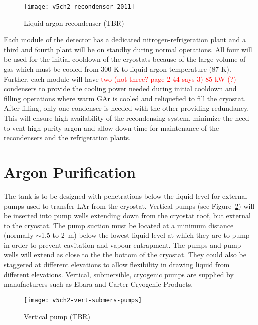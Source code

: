 \begin{figure}[htbp]
\centering
\texttt{[image: v5ch2-recondensor-2011]}
\caption{Liquid argon recondenser (TBR)}
\label{fig:v5ch2-recondenser-sept-2011}
\end{figure}

Each module of the detector has a dedicated nitrogen-refrigeration plant 
 and a third and fourth plant will be on standby during normal operations. All four will be used
for the initial cooldown of the cryostats
because of the large volume of gas which must be cooled from 300 K to liquid
argon temperature (87 K). Further, each module will
have \textcolor{red}{two (not three? page 2-44 says 3) 85 kW (?)} condensers to provide the
cooling power needed during initial cooldown and filling operations where warm GAr
is cooled and reliquefied to fill the cryostat.
After filling, only one condenser is needed with the
other providing redundancy.
This will ensure high availability of the recondensing system, minimize the need to vent high-purity argon and allow down-time for maintenance of
the recondensers and the refrigeration plants. 

\section{Argon Purification}
\label{subsec:argon-pur}
 The tank is to be designed with penetrations below the liquid level for external pumps used to transfer LAr from the cryostat. Vertical 
pumps (see Figure~\ref{fig:vert-submers-pumps}) will be inserted into 
pump wells extending down from the cryostat roof, but external to the cryostat.  The pump suction 
must be located at a minimum distance (normally $\sim$1.5 to 2~m) below 
the lowest liquid level at which they are to pump in order to prevent 
cavitation and vapour-entrapment. 
The pumps and pump wells will extend as close to the the bottom of the cryostat.  They 
could also be staggered at different elevations to allow flexibility in drawing liquid from different 
elevations. Vertical, submersible, cryogenic pumps are supplied by manufacturers such as Ebara and 
Carter Cryogenic Products. 

\begin{figure}[htbp]
\centering
\texttt{[image: v5ch2-vert-submers-pumps]}
\caption{Vertical pump (TBR) }
\label{fig:vert-submers-pumps}
\end{figure}

